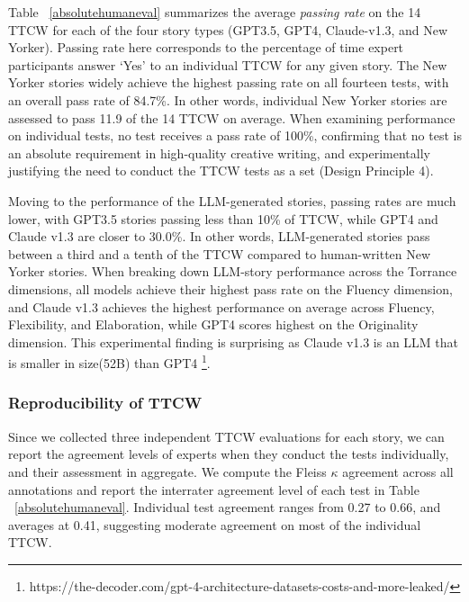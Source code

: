 Table ~\ref{absolutehumaneval} summarizes the average \textit{passing rate} on the 14 TTCW for each of the four story types (GPT3.5, GPT4, Claude-v1.3, and New Yorker). Passing rate here corresponds to the percentage of time expert participants answer `Yes' to an individual TTCW for any given story. The New Yorker stories widely achieve the highest passing rate on all fourteen tests, with an overall pass rate of 84.7\%. In other words, individual New Yorker stories are assessed to pass 11.9 of the 14 TTCW on average. When examining performance on individual tests, no test receives a pass rate of 100\%, confirming that no test is an absolute requirement in high-quality creative writing, and experimentally justifying the need to conduct the TTCW tests as a set (Design Principle 4).

Moving to the performance of the LLM-generated stories, passing rates are much lower, with GPT3.5 stories passing less than 10\% of TTCW, while GPT4 and Claude v1.3 are closer to 30.0\%. In other words, LLM-generated stories pass between a third and a tenth of the TTCW compared to human-written New Yorker stories. When breaking down LLM-story performance across the Torrance dimensions, all models achieve their highest pass rate on the Fluency dimension, and Claude v1.3 achieves the highest performance on average across Fluency, Flexibility, and Elaboration, while GPT4 scores highest on the Originality dimension. This experimental finding is surprising as Claude v1.3 is an LLM that is smaller in size(52B) than GPT4 \footnote{https://the-decoder.com/gpt-4-architecture-datasets-costs-and-more-leaked/}. 

\subsubsection{Reproducibility of TTCW}

Since we collected three independent TTCW evaluations for each story, we can report the agreement levels of experts when they conduct the tests individually, and their assessment in aggregate. We compute the Fleiss $\kappa$ agreement across all annotations and report the interrater agreement level of each test in Table ~\ref{absolutehumaneval}. Individual test agreement ranges from 0.27 to 0.66, and averages at 0.41, suggesting moderate agreement on most of the individual TTCW.

